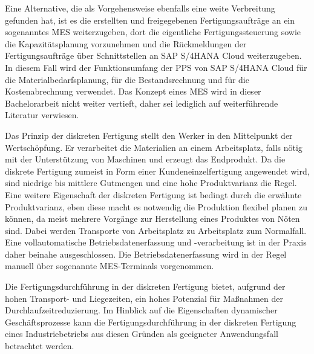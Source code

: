 Eine Alternative, die als Vorgehensweise ebenfalls eine weite Verbreitung gefunden hat, ist es die erstellten und freigegebenen Fertigungsaufträge an ein sogenanntes \ac{MES} weiterzugeben, dort die eigentliche Fertigungssteuerung sowie die Kapazitätsplanung vorzunehmen und die Rückmeldungen der Fertigungsaufträge über Schnittstellen an SAP S/4HANA Cloud weiterzugeben. 
\cite{Gerberich.2011}
In diesem Fall wird der Funktionsumfang der \ac{PPS} von SAP S/4HANA Cloud  für die Materialbedarfsplanung, für die Bestandsrechnung und für die Kostenabrechnung verwendet.
\cite{Dickersbach.2014}
Das Konzept eines \ac{MES} wird in dieser Bachelorarbeit nicht weiter vertieft, daher sei lediglich auf weiterführende Literatur verwiesen.
\cite{Kletti.2007} \cite{Gerberich.2011}


Das Prinzip der diskreten Fertigung stellt den Werker in den Mittelpunkt der Wertschöpfung. 
Er verarbeitet die Materialien an einem Arbeitsplatz, falls nötig mit der Unterstützung von Maschinen und erzeugt das Endprodukt. 
\cite{Gerberich.2011}
Da die diskrete Fertigung zumeist in Form einer Kundeneinzelfertigung angewendet wird, sind niedrige bis mittlere Gutmengen und eine hohe Produktvarianz die Regel. 
Eine weitere Eigenschaft der diskreten Fertigung ist bedingt durch die erwähnte Produktvarianz, eben diese macht es notwendig die Produktion flexibel planen zu können, da meist mehrere Vorgänge zur Herstellung eines Produktes von Nöten sind.
Dabei werden Transporte von Arbeitsplatz zu Arbeitsplatz zum Normalfall.
Eine vollautomatische Betriebsdatenerfassung und -verarbeitung ist in der Praxis daher beinahe ausgeschlossen.
Die Betriebsdatenerfassung wird in der Regel manuell über sogenannte \ac{MES}-Terminals vorgenommen.
\cite{Gerberich.2011}

Die Fertigungsdurchführung in der diskreten Fertigung bietet, aufgrund der hohen Transport- und Liegezeiten, ein hohes Potenzial für Maßnahmen der Durchlaufzeitreduzierung.
Im Hinblick auf die Eigenschaften dynamischer Geschäftsprozesse kann die Fertigungsdurchführung in der diskreten Fertigung eines Industriebetriebs aus diesen Gründen als geeigneter Anwendungsfall betrachtet werden.  

